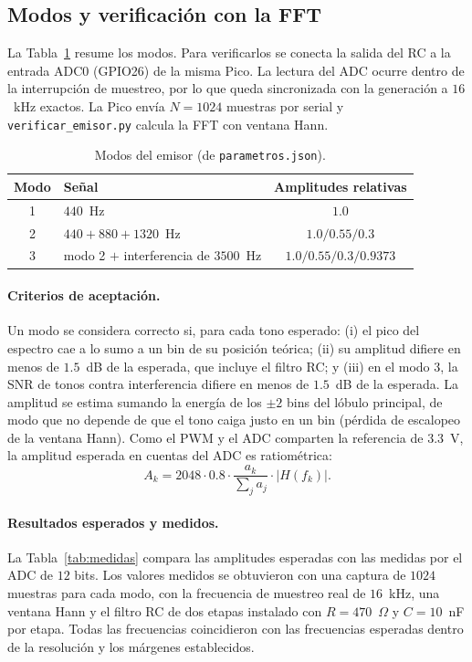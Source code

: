 \subsection{Modos y verificación con la FFT}

La Tabla~\ref{tab:modos} resume los modos. Para verificarlos se conecta la salida del RC a la entrada ADC0 (GPIO26) de la misma Pico. La lectura del ADC ocurre dentro de la interrupción de muestreo, por lo que queda sincronizada con la generación a $16$~kHz exactos. La Pico envía $N=1024$ muestras por serial y \texttt{verificar\_emisor.py} calcula la FFT con ventana Hann.

\begin{table}[h]
\centering
\begin{tabular}{|c|l|c|}
\hline
\textbf{Modo} & \textbf{Señal} & \textbf{Amplitudes relativas} \\ \hline
1 & $440$~Hz & $1.0$ \\ \hline
2 & $440 + 880 + 1320$~Hz & $1.0 / 0.55 / 0.3$ \\ \hline
3 & modo 2 $+$ interferencia de $3500$~Hz & $1.0 / 0.55 / 0.3 / 0.9373$ \\ \hline
\end{tabular}
\caption{Modos del emisor (de \texttt{parametros.json}).}
\label{tab:modos}
\end{table}

\paragraph{Criterios de aceptación.} Un modo se considera correcto si, para cada tono esperado: (i) el pico del espectro cae a lo sumo a un bin de su posición teórica; (ii) su amplitud difiere en menos de $1.5$~dB de la esperada, que incluye el filtro RC; y (iii) en el modo 3, la SNR de tonos contra interferencia difiere en menos de $1.5$~dB de la esperada. La amplitud se estima sumando la energía de los $\pm 2$ bins del lóbulo principal, de modo que no depende de que el tono caiga justo en un bin (pérdida de escalopeo de la ventana Hann). Como el PWM y el ADC comparten la referencia de $3.3$~V, la amplitud esperada en cuentas del ADC es ratiométrica:
\begin{equation}
A_k = 2048\cdot 0.8\cdot \frac{a_k}{\sum_j a_j}\cdot |H(f_k)|.
\end{equation}

\paragraph{Resultados esperados y medidos.} La Tabla~\ref{tab:medidas} compara las amplitudes esperadas con las medidas por el ADC de $12$ bits. Los valores medidos se obtuvieron con una captura de $1024$ muestras para cada modo, con la frecuencia de muestreo real de $16$~kHz, una ventana Hann y el filtro RC de dos etapas instalado con $R=470$~$\Omega$ y $C=10$~nF por etapa. Todas las frecuencias coincidieron con las frecuencias esperadas dentro de la resolución y los márgenes establecidos.

